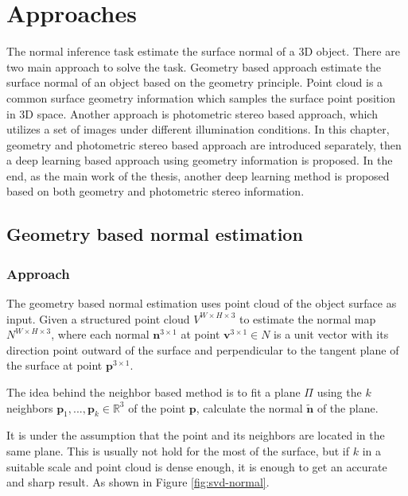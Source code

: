 \chapter{Approaches} %

\label{ch:03} %
The normal inference task estimate the surface normal of a 3D object. There are two main approach to solve the task. Geometry based approach estimate the surface normal of an object based on the geometry principle. Point cloud is a common surface geometry information which samples the surface point position in 3D space. Another approach is photometric stereo based approach, which utilizes a set of images under different illumination conditions. In this chapter, geometry and photometric stereo based approach are introduced separately, then a deep learning based approach using geometry information is proposed. In the end, as the main work of the thesis, another deep learning method is proposed based on both geometry and photometric stereo information.


\section{Geometry based normal estimation}


\subsection{Approach}
The geometry based normal estimation uses point cloud of the object surface as input.
Given a structured point cloud $ V^{W\times H\times 3} $ to estimate the normal map  $ N^{W\times H \times 3} $, where each normal  $ \textbf{n}^{3\times 1} $ at point $ \textbf{v}^{3\times 1} \in N $ is a unit vector with its direction point outward of the surface and perpendicular to the tangent plane of the surface at point $ \textbf{p}^{3\times 1} $.

The idea behind the neighbor based method is to fit a plane $ \Pi $ using the $ k $ neighbors $ \textbf{p}_1, ..., \textbf{p}_k \in \mathbb{R}^3 $ of the point $ \textbf{p} $, calculate the normal  $ \tilde{\textbf{n}} $ of the plane. 

It is under the assumption that the point and its neighbors are located in the same plane. This is usually not hold for the most of the surface, but if $ k $ in a suitable scale and point cloud is dense enough, it is enough to get an accurate and sharp result. As shown in Figure \ref{fig:svd-normal}. 

